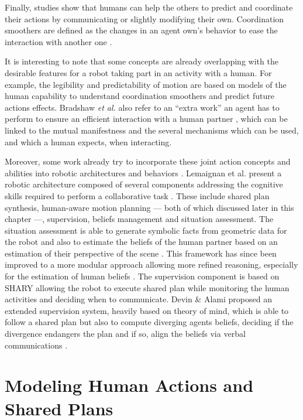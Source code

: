 \documentclass[a4paper,11pt,twoside]{StyleThese}
\begin{document}
Finally, studies show that humans can help the others to predict and coordinate their actions by communicating or slightly modifying their own. Coordination smoothers are defined as the changes in an agent own's behavior to ease the interaction with another one \cite{vesper_minimal_2010}.

It is interesting to note that some concepts are already overlapping with the desirable features for a robot taking part in an activity with a human. For example, the legibility and predictability of motion are based on models of the human capability to understand coordination smoothers and predict future actions effects. Bradshaw \textit{et al.} also refer to an ``extra work'' an agent has to perform to ensure an efficient interaction with a human partner \cite{bradshaw2003adjustable}, which can be linked to the mutual manifestness and the several mechanisms which can be used, and which a human expects, when interacting.

Moreover, some work already try to incorporate these joint action concepts and abilities into robotic architectures and behaviors \cite{khamassi2016integration, clodic2017key}. Lemaignan et al. present a robotic architecture composed of several components addressing the cognitive skills required to perform a collaborative task \cite{lemaignan2017artificial}. These include shared plan synthesis, human-aware motion planning --- both of which discussed later in this chapter ---, supervision, beliefs management and situation assessment. The situation assessment is able to generate symbolic facts from geometric data for the robot and also to estimate the beliefs of the human partner based on an estimation of their perspective of the scene \cite{milliez2014framework}. This framework has since been improved to a more modular approach allowing more refined reasoning, especially for the estimation of human beliefs \cite{lemaignan2018underworlds}. The supervision component is based on SHARY \cite{clodic2009shary} allowing the robot to execute shared plan while monitoring the human activities and deciding when to communicate. Devin \& Alami proposed an extended supervision system, heavily based on theory of mind, which is able to follow a shared plan but also to compute diverging agents beliefs, deciding if the divergence endangers the plan and if so, align the beliefs via verbal communications \cite{devin2016implemented}.

\section{Modeling Human Actions and Shared Plans}
\end{document}
